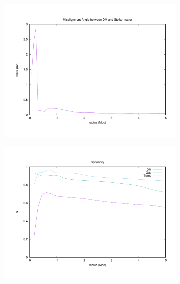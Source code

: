 \documentclass[journal]{IEEEtran}
\begin{document}
\begin{figure}[!t]
\centering
	\begin{subfigure}[t]{0.45\textwidth}
		\centering
		\includegraphics[width=\linewidth]{GasDMAlign}
	\end{subfigure}
	\quad
	\begin{subfigure}[t]{0.45\textwidth}
		\centering
		\includegraphics[width=\linewidth]{Sphericity}
	\end{subfigure}
	\\
	\begin{subfigure}[t]{0.45\textwidth}
		\centering

\end{subfigure}
\end{figure}
\end{document}
